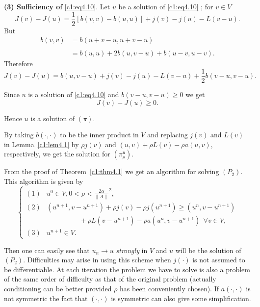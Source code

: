 \textbf{(3) Sufficiency of} \eqref{c1:eq4.10}. Let $u$ be a solution
of \eqref{c1:eq4.10} ; for $v \in V$ 
\begin{equation}
J(v) - J(u) = \frac{1}{2} [b(v, v) -b (u, u)] + j(v) - j(u) -L(v -
u). \tag{4.17}\label{c1:eq4.17}
\end{equation}
But 
\begin{align*}
b(v,v) & = b(u+v-u, u+v-u)\\
&\\
& = b(u,u)+2b(u,v-u) +b(u-v,u-v).
\end{align*}
Therefore\pageoriginale
\begin{equation*}
J(v) - J(u) = b(u, v - u)+ j (v) - j(u) - L(v - u)+ \frac{1}{2}b(v -
u, v - u). \tag{4.18}\label{c1:eq4.18} 
\end{equation*}

Since $u$ is a solution of \eqref{c1:eq4.10} and $b(v - u, v - u) \geq 0$ we get 
\begin{equation*}
J(v) - J(u) \geq 0. \tag{4.19}\label{c1:eq4.19}
\end{equation*}

Hence $u$ is a solution of $(\pi)$. 

By taking $b(\cdot , \cdot)$ to be the inner product in $V$ and replacing
$j(v)$ and $L(v)$ in Lemma~\ref{c1:lem4.1} by $ \rho j(v)$ and $(u, v) + \rho L(v)
-\rho a(u,v)$, respectively, we get the solution for $(\pi^u_\rho)$. 

\begin{remark}\label{c1:rem4.1}%
From the proof of Theorem~\ref{c1:thm4.1} we get an algorithm for solving
$(P_2)$. This algorithm is given by  
\begin{equation*}
\begin{cases}
 (1)&u^0 \in V, 0 < \rho < \frac{2 \alpha}{\parallel A \parallel}^2,\\
(2) &(u^{n+1}, v - u^{n+1}) + \rho j(v) - \rho j(u^{n+1}) \geq (u^n, v
  - u^{n+1})\\ 
 & \hspace{2cm}+ \rho L(v - u^{n+1}) -\rho a(u^n, v-u^{n+1}) ~~\forall v
  \in V,\\ 
(3)& u^{n+1} \in V.
\end{cases}\tag{4.20}\label{c1:eq4.20} 
\end{equation*}
\end{remark}

Then one can easily see that $u_n \to u$ \textit{strongly} in $V$ and
$u$ will be the solution of $(P_2)$. Difficulties may arise in using
this scheme when $j( \cdot)$ is not assumed to be differentiable. At
each iteration the problem we have to solve is also a problem of the
same order of difficulty as that of the original problem (actually
conditioning can be better provided $\rho$ has been conveniently
chosen). If $a(\cdot , \cdot)$ is not symmetric the fact that $(\cdot , \cdot)$ is
symmetric can also give some simplification.  

